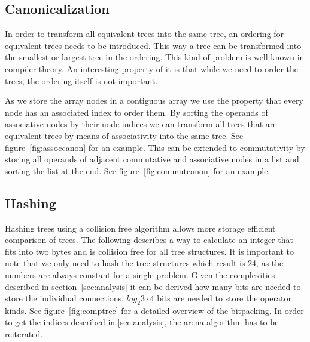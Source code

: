 \documentclass[11pt,a4paper]{article}
\begin{document}
\subsection{Canonicalization}

In order to transform all equivalent trees into the same tree, an
ordering for equivalent trees needs to be introduced.
This way a tree can be transformed into the smallest or largest tree
in the ordering.
This kind of problem is well known in compiler theory.
An interesting property of it is that while we need to order the
trees, the ordering itself is not important.

As we store the array nodes in a contiguous array we use the property
that every node has an associated index to order them.
By sorting the operands of associative nodes by their node indices we
can transform all trees that are equivalent trees by means of
associativity into the same tree. See figure~\ref{fig:assoccanon} for
an example.
This can be extended to commutativity by storing all operands of
adjacent commutative and associative nodes in a list and sorting the
list at the end.
See figure~\ref{fig:commutcanon} for an example.

\subsection{Hashing}

Hashing trees using a collision free algorithm allows more storage
efficient comparison of trees.
The following describes a way to calculate an integer that fits into
two bytes and is collision free for all tree structures.
It is important to note that we only need to hash the tree structures
which result is 24, as the numbers are always constant for a single
problem.
Given the complexities described in section~\ref{sec:analysis} it can
be derived how many bits are needed to store the individual
connections.
$log_2{3 \cdot 4}$ bits are needed to store the operator kinds.
See figure~\ref{fig:comptree} for a detailed overview of the
bitpacking.
In order to get the indices described in \ref{sec:analysis}, the arena
algorithm has to be reiterated.



\end{document}
